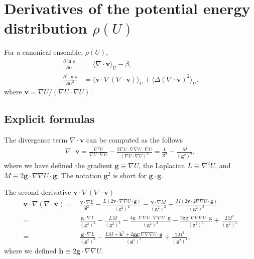 \documentclass{article}
\begin{document}
\section{Derivatives of the potential energy distribution $\rho(U)$}
%
%
%
For a canonical ensemble, $\rho(U)$,
\begin{align}
\frac {\partial \ln \rho} 
      {\partial U}
    & = \langle \nabla \cdot \mathbf v \rangle_U - \beta, \\
\frac {\partial^2 \ln \rho}
      {\partial U^2}
    & = \langle \mathbf v \cdot \nabla (\nabla \cdot \mathbf v) \rangle_U
      + \langle \Delta (\nabla \cdot \mathbf v)^2 \rangle_U.
\end{align}
where $\mathbf v = \nabla U/(\nabla U \cdot \nabla U)$.






\subsection{Explicit formulas}
%
%
%
The divergence term $\nabla \cdot \mathbf v$ can be computed as the follows
%
\begin{align*}
\nabla \cdot \mathbf v
     = \frac { \nabla^2 U }
              { \nabla U \cdot \nabla U }
      - \frac { 2 \nabla U \cdot \nabla \nabla U \cdot \nabla U }
              { (\nabla U \cdot \nabla U)^2 }
     = \frac { L }
              { \mathbf g^2 }
      - \frac { M }
              { (\mathbf g^2)^2 },
\end{align*}
%
where we have defined
the gradient 
$\mathbf g \equiv \nabla U$, 
the Laplacian 
$L \equiv \nabla^2 U$,
and
$M \equiv 2 \mathbf g \cdot \nabla \nabla U \cdot \mathbf g$;
The notation $\mathbf g^2$ is short for $\mathbf g \cdot \mathbf g$.


The second derivative $\mathbf v \cdot \nabla (\nabla \cdot \mathbf v)$
\begin{align*}
\mathbf v \cdot \nabla (\nabla \cdot \mathbf v)
    = &  \frac { \mathbf v \cdot \nabla L }
              { \mathbf g^2 }
      - \frac { L (2 \mathbf v \cdot \nabla \nabla U \cdot \mathbf g) }
              { (\mathbf g^2)^2 }
     - \frac { \mathbf v \cdot \nabla M }
              { (\mathbf g^2)^2 } 
      + \frac { M (2 \mathbf v \cdot 2 \nabla \nabla U \cdot \mathbf g)}
              { (\mathbf g^2)^3 } 
\\
   = & \frac { \mathbf g \cdot \nabla L }
              { (\mathbf g^2)^2 }
      - \frac { L M }
              { (\mathbf g^2)^3 }
     - \frac { 4 \mathbf g \cdot \nabla \nabla U \cdot \nabla \nabla U \cdot \mathbf g }
              { (\mathbf g^2)^3 } 
      - \frac { 2 \mathbf g \mathbf g : \nabla \nabla \nabla U \cdot \mathbf g }
              { (\mathbf g^2)^3 } 
      + \frac { 2 M^2}
              { (\mathbf g^2)^4 } 
\\
   = & \frac { \mathbf g \cdot \nabla L }
              { (\mathbf g^2)^2 }
     - \frac { L M + \mathbf h^2  + 2 \mathbf g \mathbf g : \nabla \nabla \nabla U \cdot \mathbf g}
              { (\mathbf g^2)^3 } 
      + \frac { 2 M^2}
              { (\mathbf g^2)^4 },
\end{align*}
where we defined $\mathbf h \equiv 2 \mathbf g \cdot \nabla \nabla U$.
\end{document}
